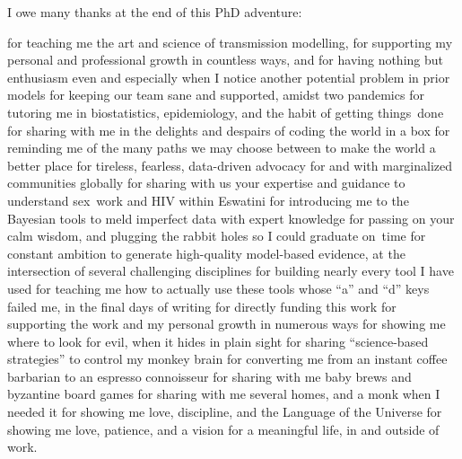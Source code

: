 I owe many thanks at the end of this PhD adventure:
\begin{acknowlist}
    {for teaching me the art and science of transmission modelling,
     for supporting my personal and professional growth in countless ways, and
     for having nothing but enthusiasm even and especially when I notice another potential problem in prior models}
    {for keeping our team sane and supported, amidst two pandemics}
    {for tutoring me in biostatistics, epidemiology, and the habit of getting things~done}
    {for sharing with me in the delights and despairs of coding the world in a box}
    {for reminding me of the many paths we may choose between to make the world a better place}
\bigskip
{}
    {for tireless, fearless, data-driven advocacy for and with marginalized communities globally}
    {for sharing with us your expertise and guidance to understand sex~work and HIV within Eswatini}
    {for introducing me to the Bayesian tools to meld imperfect data with expert knowledge}
    {for passing on your calm wisdom, and plugging the rabbit holes so I could graduate on~time}
\bigskip
{}
    {for constant ambition to generate high-quality model-based evidence, at the intersection of several challenging disciplines}
    {for building nearly every tool I have used}
    {for teaching me how to actually use these tools}
    {whose ``a'' and ``d'' keys failed me, in the final days of writing}
\bigskip
{}
    {for directly funding this work}
    {for supporting the work and my personal growth in numerous ways}
\bigskip
{}
    {for showing me where to look for evil, when it hides in plain sight}
    {for sharing ``science-based strategies'' to control my monkey brain}
    {for converting me from an instant coffee barbarian to an espresso connoisseur}
    {for sharing with me baby brews and byzantine board games}
    {for sharing with me several homes, and a monk when I needed it}
    {for showing me love, discipline, and the Language of the Universe}
    {for showing me love, patience, and a vision for a meaningful life, in and outside of work.}
\end{acknowlist}
